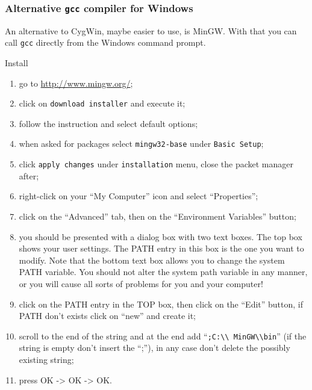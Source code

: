 \begin{frame}
  \frametitle{Alternative \texttt{gcc} compiler for Windows}
  An alternative to CygWin, maybe easier to use, is
  \alert{MinGW}. With that you can call \texttt{gcc} directly from the
  Windows command prompt.
  \begin{block}{Install}
    \tiny
    \begin{enumerate}
    \item go to \alert{\url{http://www.mingw.org/}};
    \item click on \alert{\texttt{download installer}} and execute it;
    \item follow the instruction and select default options;
    \item when asked for packages select \alert{\texttt{mingw32-base}}
      under \texttt{Basic Setup};
    \item click \alert{\texttt{apply changes}} under
      \alert{\texttt{installation}} menu, close the packet manager after;
    \item right-click on your ``My Computer'' icon and select
      ``Properties'';
    \item click on the ``Advanced'' tab, then on the ``Environment
      Variables'' button;
    \item you should be presented with a dialog box with two text
      boxes. The top box shows your user settings. The PATH entry in
      this box is the one you want to modify. Note that the bottom
      text box allows you to change the system PATH variable. You
      should not alter the system path variable in any manner, or you
      will cause all sorts of problems for you and your computer!
    \item click on the PATH entry in the TOP box, then click on the
      ``Edit'' button, if PATH don't exists click on ``new'' and create
      it;
    \item scroll to the end of the string and at the end add
      ``\alert{\texttt{;C:\textbackslash\textbackslash
          MinGW\textbackslash\textbackslash bin}}'' (if the string is empty don't
      insert the ``;''), in any case don't delete the possibly existing
      string;
    \item press OK -> OK -> OK.
    \end{enumerate}
  \end{block}
\end{frame}


